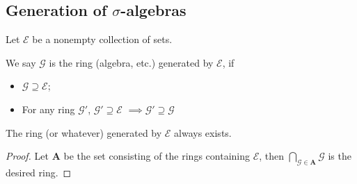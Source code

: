 \subsection{Generation of $\sigma$-algebras}
\label{sub:Generation of sigma-algebras}

Let $\mathscr{E}$ be a nonempty collection of sets.
\begin{definition}
	We say $\mathscr{G}$ is the ring (algebra, etc.) generated by $\mathscr{E}$, if
	\begin{itemize}
		\item $ \mathscr{G}\supseteq \mathscr{E}$;
		\item For any ring $\mathscr{G}'$, $ \mathscr{G}'\supseteq \mathscr{E}$
			$\implies \mathscr{G}'\supseteq \mathscr{G}$
	\end{itemize}
\end{definition}
\begin{proposition}
	The ring (or whatever) generated by $\mathscr{E}$ always exists.
\end{proposition}
\begin{proof}[Proof]
    Let $\mathbf{A}$ be the set consisting of the rings
	containing $\mathscr{E}$, then $\bigcap_{\mathscr{G}\in \mathbf{A}} \mathscr{G}$
	is the desired ring.
\end{proof}


